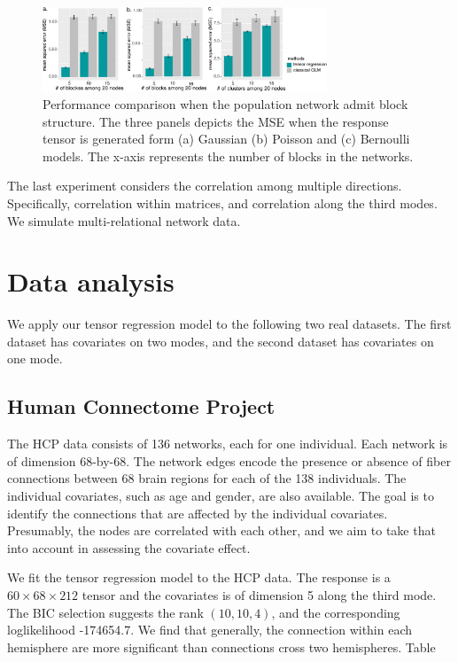 \documentclass[11pt]{article}
\theoremstyle{plain}
\theoremstyle{definition}
\begin{document}
{\begin{figure}[H]
\includegraphics[width=8.5cm]{..//../code/binary_tucker/team/figure/comparison.pdf}
\caption{Performance comparison when the population network admit block structure. The three panels depicts the MSE when the response tensor is generated form (a) Gaussian (b) Poisson and (c) Bernoulli models. The x-axis represents the number of blocks in the networks. }
\end{figure}

The last experiment considers the correlation among multiple directions. Specifically, correlation within matrices, and correlation along the third modes. We simulate multi-relational network data. 
\section{Data analysis}
We apply our tensor regression model to the following two real datasets. The first dataset has covariates on two modes, and the second dataset has covariates on one mode. 





\subsection{Human Connectome Project}
The HCP data consists of 136 networks, each for one individual. Each network is of dimension 68-by-68. The network edges encode the presence or absence of fiber connections between 68 brain regions for each of the 138 individuals. The individual covariates, such as age and gender, are also available. The goal is to identify the connections that are affected by the individual covariates. Presumably, the nodes are correlated with each other, and we aim to take that into account in assessing the covariate effect. 

We fit the tensor regression model to the HCP data. The response is a $60\times 68 \times 212$ tensor and the covariates is of dimension 5 along the third mode. The BIC selection suggests the rank $(10,10,4)$, and the corresponding loglikelihood -174654.7. We find that generally, the connection within each hemisphere are more significant than connections cross two hemispheres. Table

}
\end{document}
